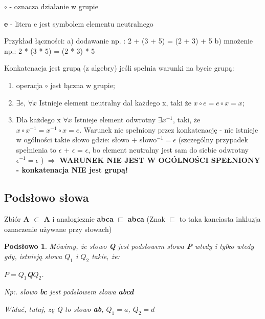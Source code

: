 $\circ$ - oznacza działanie w grupie 

{\bf e} - litera e jest symbolem elementu neutralnego \newline

Przykład łączności:
a) dodawanie np. : 2 + (3 + 5) = (2 + 3) + 5
b) mnożenie np.:  2 * (3 * 5) = (2 * 3) * 5
 
Konkatenacja jest grupą (z algebry) jeśli spełnia warunki na bycie grupą:


\begin{enumerate}[label=(\roman*)]
  \item operacja $\circ$ jest łączna w grupie;
  \item $\exists e$, $\forall x $ Istnieje element neutralny dal każdego x, taki że  $x \circ e = e \circ x = x$;
  \item Dla każdego x $\forall x $   Istnieje element odwrotny  $\exists x^{-1}$, taki, że  $x \circ  x^{-1} = x^{-1} \circ x = e$. \newline Warunek nie spełniony przez konkatenację - nie istnieje w ogólności takie słowo gdzie: słowo + słowo$^{-1} = \epsilon$ 
  (szczególny przypadek spełnienia to $\epsilon$ + $\epsilon$ = $\epsilon$, bo element neutralny jest sam do siebie odwrotny $\epsilon^{-1} = \epsilon$ ) \newline $\Rightarrow$ {\bf WARUNEK NIE JEST W OGÓLNOŚCI SPEŁNIONY - konkatenacja NIE jest grupą!}
\end{enumerate}


\subsection{Podsłowo słowa}
Zbiór { \bf A } $\subset$   { \bf A } i analogicznie  { \bf abca } $\sqsubset$  { \bf abca }
(Znak $\sqsubset$  to taka kanciasta inkluzja oznaczenie używane przy słowach)


\newtheorem*{theorem9*}{Podsłowo}
\begin{theorem9*}
Mówimy, że słowo {\bf Q} jest podsłowem słowa {\bf P} wtedy i tylko wtedy gdy, istnieją słowa $Q_{1}$ i $Q_{2}$ takie, że:
\begin{center}
$P = Q_{1}${\bf Q}$Q_{2}$.
\end{center}
Np:. słowo {\bf bc} jest podsłowem słowa {\bf abcd} 


\begin{center}
\end{center}

Widać, tutaj, zę Q to słowo {\bf ab}, $Q_{1} = a$, $Q_{2}=d$
\end{theorem9*}
 

